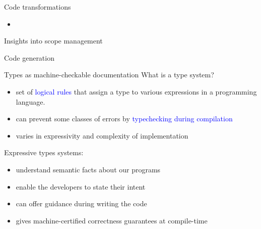 \documentclass[handout]{beamer}
\newcommand{\keyword}[1]{\textcolor{blue}{#1}}
\begin{document}
\begin{frame}{Code transformations}
 \begin{itemize}
   \item
 \end{itemize}
\end{frame}


\begin{frame}{Insights into scope management}

\end{frame}


\begin{frame}{Code generation}

\end{frame}

\begin{frame}{Types as machine-checkable documentation}
What is a type system?
\begin{itemize}
  \item set of \keyword{logical rules} that assign a type to various expressions in a programming language.
  \item can prevent some classes of errors by \keyword{typechecking during compilation}
  \item varies in expressivity and complexity of implementation
\end{itemize}
Expressive types systems:
\begin{itemize}
  \item understand semantic facts about our programs
  \item enable the developers to state their intent
  \item can offer guidance during writing the code
  \item gives machine-certified correctness guarantees at compile-time
\end{itemize}
\end{frame}
\end{document}
